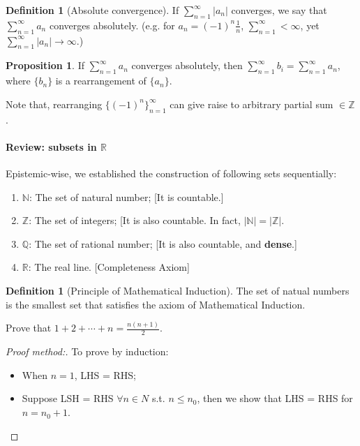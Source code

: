 \documentclass[12pt]{article}
\newcommand{\N}{{\mathbb N}}
\newcommand{\Q}{{\mathbb Q}}
\newcommand{\R}{{\mathbb R}}
\newcommand{\Z}{{\mathbb Z}}
\theoremstyle{definition}
\newtheorem{definition}[theorem]{Definition}
\newtheorem{proposition}[theorem]{Proposition}
\theoremstyle{plain}
\begin{document}
\begin{definition}
    [Absolute convergence]
    If $\sum_{n=1}^\infty |a_n|$ converges, we say that $\sum_{n=1}^\infty a_n$ 
    converges absolutely.
    (e.g. for $a_n = (-1)^n \frac{1}{n}$, $\sum_{n=1}^\infty < \infty$, yet 
    $\sum_{n=1}^\infty |a_n| \to \infty$.)
\end{definition}

\begin{proposition}
    If $\sum_{n=1}^\infty a_n$ converges absolutely, then $\sum_{n=1}^\infty b_i 
    = \sum_{n=1}^\infty a_n$, where $\{b_n\}$ is a rearrangement of $\{a_n\}$.
    
    Note that, rearranging $\{(-1)^n\}_{n=1}^\infty$ can give raise to arbitrary 
    partial sum $\in \Z$.
\end{proposition}

\paragraph{Review: subsets in $\R$}
Epistemic-wise, we established the construction of following sets sequentially: 
\begin{enumerate}
    \item $\N$: The set of natural number; [It is countable.]
    \item $\Z$: The set of integers; [It is also countable. In fact, $|\N| = |\Z|$.
    \item $\Q$: The set of rational number; [It is also countable, and 
        \textbf{dense}.]
    \item $\R$: The real line. [Completeness Axiom]
\end{enumerate}

\begin{definition}
    [Principle of Mathematical Induction]
    The set of natual numbers is the smallest set that satisfies the axiom of 
    Mathematical Induction.

    \begin{example}
        Prove that $1 + 2 + \cdots + n = \frac{n(n+1)}{2}$.
        \begin{proof}[Proof method:]
            To prove by induction: 
            \begin{itemize}
                \item When $n = 1$, LHS = RHS;
                \item Suppose LSH = RHS $\forall n \in N$ s.t. $n \le n_0$, then 
                    we show that LHS = RHS for $n = n_0 + 1$.
            \end{itemize}
        \end{proof}
    \end{example}
\end{definition}
\end{document}
